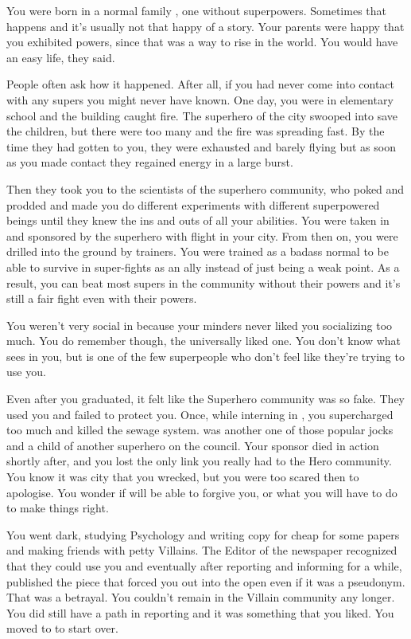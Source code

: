 \documentclass[char]{LRSguildcamp1}
\begin{document}
\name{\cYS{}}

You were born in a normal family , one without superpowers. Sometimes that happens and it's usually not that happy of a story. Your parents were happy that you exhibited powers, since that was a way to rise in the world. You would have an easy life, they said. 

People often ask how it happened. After all, if you had never come into contact with any supers you might never have known. One day, you were in elementary school and the building caught fire. The superhero of the city swooped into save the children, but there were too many and the fire was spreading fast. By the time they had gotten to you, they were exhausted and barely flying but as soon as you made contact they regained energy in a large burst. 

Then they took you to the scientists of the superhero community, who poked and prodded and made you do different experiments with different superpowered beings until they knew the ins and outs of all your abilities. You were taken in and sponsored by the superhero with flight in your city. From then on, you were drilled into the ground by trainers. You were trained as a badass normal to be able to survive in super-fights as an ally instead of just being a weak point. As a result, you can beat most supers in the community without their powers and it's still a fair fight even with their powers.  

You weren't very social in \pSuperSchool{} because your minders never liked you socializing too much. You do remember \cYoungest{} though, the universally liked one. You don't know what \cYoungest{} sees in you, but \cYoungest{} is one of the few superpeople who don't feel like they're trying to use you. 

Even after you graduated, it felt like the Superhero community was so fake. They used you and failed to protect you. Once, while interning in \pCityO{} , you supercharged \cJuggernaut{} too much and killed the sewage system. \cJuggernaut{} was another one of those popular jocks and a child of another superhero on the council. Your sponsor died in action shortly after, and you lost the only link you really had to the Hero community. You know it was \cOS{} city that you wrecked, but you were too scared then to apologise. You wonder if \cOS{} will be able to forgive you, or what you will have to do to make things right. 

You went dark, studying Psychology and writing copy for cheap for some papers and making friends with petty Villains. The Editor of the newspaper recognized that they could use you and eventually after reporting and informing for a while, published the piece that forced you out into the open even if it was a pseudonym. That was a betrayal. You couldn't remain in the Villain community any longer. You did still have a path in reporting and it was something that you liked. You moved to \pCityY{} to start over. 
\end{document}

